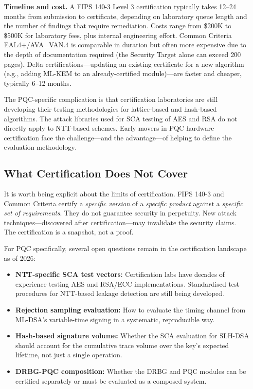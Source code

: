 \begin{svgraybox}
\textbf{Timeline and cost.}  A FIPS 140-3 Level 3 certification typically takes 12--24 months from submission to certificate, depending on laboratory queue length and the number of findings that require remediation.  Costs range from \$200K to \$500K for laboratory fees, plus internal engineering effort.  Common Criteria EAL4+/AVA\_VAN.4 is comparable in duration but often more expensive due to the depth of documentation required (the Security Target alone can exceed 200 pages).  Delta certifications---updating an existing certificate for a new algorithm (e.g., adding ML-KEM to an already-certified module)---are faster and cheaper, typically 6--12 months.
\end{svgraybox}

The PQC-specific complication is that certification laboratories are still developing their testing methodologies for lattice-based and hash-based algorithms.  The attack libraries used for SCA testing of AES and RSA do not directly apply to NTT-based schemes.  Early movers in PQC hardware certification face the challenge---and the advantage---of helping to define the evaluation methodology.

\subsection{What Certification Does Not Cover}
\label{subsec:cert-gaps}

It is worth being explicit about the limits of certification.  FIPS 140-3 and Common Criteria certify a \emph{specific version} of a \emph{specific product} against a \emph{specific set of requirements}.  They do not guarantee security in perpetuity.  New attack techniques---discovered after certification---may invalidate the security claims.  The certification is a snapshot, not a proof.

For PQC specifically, several open questions remain in the certification landscape as of 2026:
\begin{itemize}
\item \textbf{NTT-specific SCA test vectors:} Certification labs have decades of experience testing AES and RSA/ECC implementations.  Standardised test procedures for NTT-based leakage detection are still being developed.
\item \textbf{Rejection sampling evaluation:} How to evaluate the timing channel from ML-DSA's variable-time signing in a systematic, reproducible way.
\item \textbf{Hash-based signature volume:} Whether the SCA evaluation for SLH-DSA should account for the cumulative trace volume over the key's expected lifetime, not just a single operation.
\item \textbf{DRBG-PQC composition:} Whether the DRBG and PQC modules can be certified separately or must be evaluated as a composed system.
\end{itemize}


